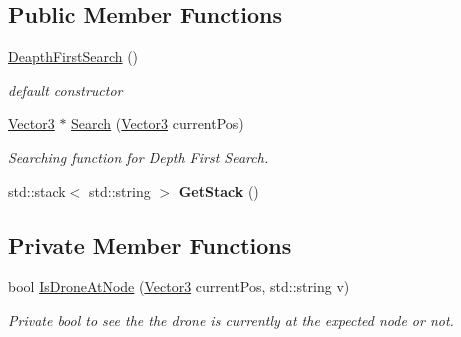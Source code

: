 \subsection*{Public Member Functions}
\begin{DoxyCompactItemize}
\item 
\mbox{\label{classDeapthFirstSearch_a17caed70389b812d14cdcada7c2e7e21}} 
\hyperlink{classDeapthFirstSearch_a17caed70389b812d14cdcada7c2e7e21}{Deapth\+First\+Search} ()
\begin{DoxyCompactList}\small\item\em default constructor \end{DoxyCompactList}\item 
\mbox{\label{classDeapthFirstSearch_a3301b804af1bf6958170856d0ddbd017}} 
\hyperlink{classVector3}{Vector3} $\ast$ \hyperlink{classDeapthFirstSearch_a3301b804af1bf6958170856d0ddbd017}{Search} (\hyperlink{classVector3}{Vector3} current\+Pos)
\begin{DoxyCompactList}\small\item\em Searching function for Depth First Search. \end{DoxyCompactList}\item 
\mbox{\label{classDeapthFirstSearch_ad5f374df061fd67a715130396f06c29a}} 
std\+::stack$<$ std\+::string $>$ {\bfseries Get\+Stack} ()
\end{DoxyCompactItemize}
\subsection*{Private Member Functions}
\begin{DoxyCompactItemize}
\item 
\mbox{\label{classDeapthFirstSearch_aa1a9887380527839af4964c69984ecf0}} 
bool \hyperlink{classDeapthFirstSearch_aa1a9887380527839af4964c69984ecf0}{Is\+Drone\+At\+Node} (\hyperlink{classVector3}{Vector3} current\+Pos, std\+::string v)
\begin{DoxyCompactList}\small\item\em Private bool to see the the drone is currently at the expected node or not. \end{DoxyCompactList}\end{DoxyCompactItemize}
